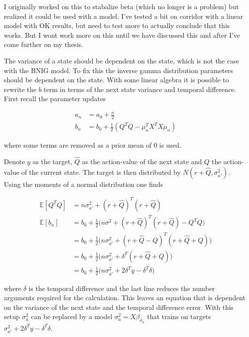 \todo I originally worked on this to stabalize beta (which no longer is a problem) but realized it could be used with a model. I've tested a bit on corridor with a linear model with OK results, but need to test more to actually conclude that this works. But I wont work more on this until we have discussed this and after I've come further on my thesis.

The variance of a state should be dependent on the state, which is not the case with the BNIG model. To fix this the inverse gamma distribution parameters should be dependent on the state. With some linear algebra it is possible to rewrite the $b$ term in terms of the next state variance and temporal difference. First recall the parameter updates

\begin{align}
    a_n &= a_0 + \frac{n}{2} \\
    b_n &= b_0 + \frac{1}{2}(Q^TQ - \mu_n^TX^TX\mu_n)
\end{align}

where some terms are removed as a prior mean of 0 is used.

Denote $y$ as the target, $\hat{Q}$ as the action-value of the next state and $Q$ the action-value of the current state. The target is then distributed by $N(r + \hat{Q}, \sigma^2_{a'})$. Using the moments of a normal distribution one finds

\begin{equation}
    \begin{split}
        \mathbb{E}[Q^TQ] &= n\sigma^2_{a'} + (r + \hat{Q})^T(r + \hat{Q})\\
        \mathbb{E}[b_n] &= b_0 + \frac{1}{2}\bigg(n\sigma^2 + (r + \hat{Q})^T(r + \hat{Q}) - Q^TQ\bigg)\\
        &= b_0 + \frac{1}{2}\bigg(n\sigma^2_{a'} + (r + \hat{Q} - Q)^T(r + \hat{Q} + Q)\bigg)\\
        &= b_0 + \frac{1}{2}\bigg(n\sigma^2_{a'} + \delta^T(r + \hat{Q} + Q)\bigg)\\
        &= b_0 + \frac{1}{2}\bigg(n\sigma^2_{a'} + 2\delta^Ty-\delta^T\delta\bigg)
    \end{split}
\end{equation}

where $\delta$ is the temporal difference and the last line reduces the number arguments required for the calculation. This leaves an equation that is dependent on the variance of the next state and the temporal difference error. With this setup $\sigma^2_a$ can be replaced by a model $\sigma^2_{a} = X\beta_{\sigma_{a}}$ that trains on targets $\sigma^2_{a'} + 2\delta^Ty-\delta^T\delta$.

\cleardoublepage